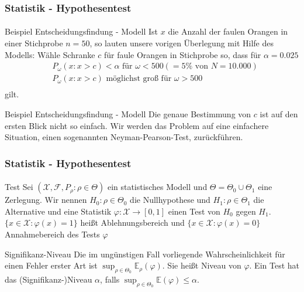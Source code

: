 \documentclass{beamer}
\begin{document}
\begin{frame}
    \frametitle{Statistik - Hypothesentest}
\framesubtitle{}
\begin{block}{Beispiel Entscheidungsfindung - Modell}
Ist $x$ die Anzahl der faulen Orangen in einer Stichprobe $n = 50$, so lauten unsere vorigen Überlegung mit Hilfe des Modells: Wähle Schranke $c$ für faule Orangen in Stichprobe so,  dass für $\alpha = 0.025$
\begin{align*}
& P_\omega(x: x >c) < \alpha  \text{ für } \omega < 500 (= 5 \% \text{ von } N = 10.000) \\
& P_\omega(x: x >c) \text{ möglichst groß für } \omega > 500\\
\end{align*}
gilt.
\end{block}

\begin{block}{Beispiel Entscheidungsfindung - Modell}
Die genaue Bestimmung von $c$ ist auf den ersten Blick nicht so einfach. Wir werden das Problem auf eine einfachere Situation, einen sogenannten Neyman-Pearson-Test, zurückführen. 
\end{block}


 \end{frame}


\begin{frame}
    \frametitle{Statistik - Hypothesentest}
\framesubtitle{}
\begin{block}{Test}
Sei   $(\mathcal{X}, \mathcal{F}, P_\rho :  \rho \in \Theta)$ ein statistisches Modell und $ \Theta =  \Theta_0 \cup  \Theta_1$ eine Zerlegung.  Wir nennen $H_0 : \rho \in \Theta_0$ die Nullhypothese und  $H_1 : \rho \in \Theta_1$ die Alternative 
und eine Statistik $\varphi: \mathcal{X} \to [0,1]$ einen Test von $H_0$ gegen $H_1$. $\{ x \in \mathcal{X}  : \varphi(x) = 1\}$ heißt Ablehnungsbereich und  $\{ x \in \mathcal{X}  : \varphi(x) = 0\}$   Annahmebereich des Tests $\varphi$
\end{block}


\begin{block}{Signifikanz-Niveau}
Die im ungünstigen Fall vorliegende Wahrscheinlichkeit für einen Fehler erster Art ist $\sup_{\rho \in \Theta_0} \mathbb{E}_{\rho}(\varphi)$. Sie heißt Niveau von $\varphi$.  Ein Test hat das (Signifikanz-)Niveau $\alpha$, falls  $\sup_{\rho \in \Theta_0} \mathbb{E}(\varphi) \leq \alpha$.
\end{block}
 \end{frame}
\end{document}
